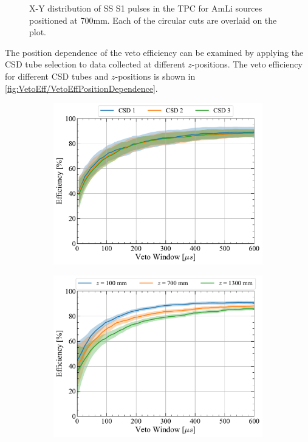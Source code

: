 \begin{enumerate}
\begin{figure}[!ht]
        \caption{X-Y distribution of SS S1 pulses in the TPC for AmLi sources positioned at 700mm. Each of the circular cuts are overlaid on the plot.}
        \label{fig:VetoEff/CSDSelection}
    \end{figure}
    The position dependence of the veto efficiency can be examined by applying the CSD tube selection to data collected at different $z$-positions. The veto efficiency for different CSD tubes and $z$-positions is shown in \autoref{fig:VetoEff/VetoEffPositionDependence}.
    \begin{figure}[!ht]
    	\centering
    	\begin{subfigure}[b]{0.49\textwidth}
    		\centering
    		\includegraphics[width=\textwidth]{figures/VetoEfficiency/Eff_AmLi_Total_AllCSD.pdf}
    		\caption{}
            \label{fig:VetoEff/VetoEffPositionDependenceZPos}
    	\end{subfigure}
    	\hfill
    	\begin{subfigure}[b]{0.49\textwidth}
    		\centering
    		\includegraphics[width=\textwidth]{figures/VetoEfficiency/Eff_AmLi_Total_AllHeights.pdf}

\end{subfigure}
\end{figure}
\end{enumerate}
